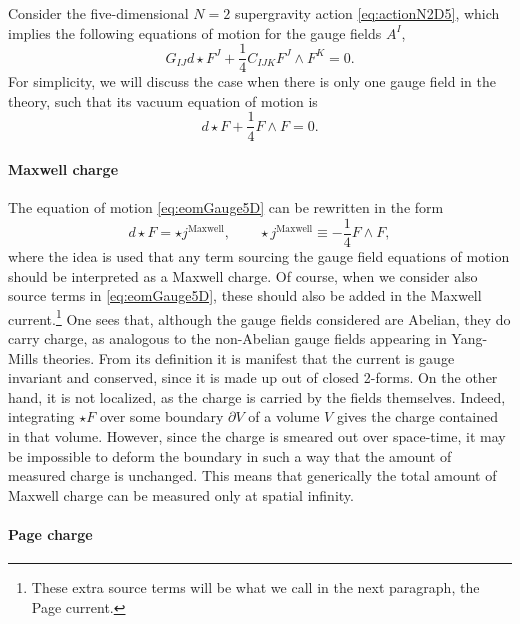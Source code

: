 \documentclass[12pt,twoside]{book}
\begin{document}
Consider the five-dimensional $N=2$ supergravity action \eqref{eq:actionN2D5}, which implies the following equations of motion for the gauge fields $A^{I}$,
\begin{equation}
G_{IJ}d\star F^{J} + \frac{1}{4} C_{IJK} F^{J} \wedge F^{K} = 0.
\end{equation}
For simplicity, we will discuss the case when there is only one gauge field in the theory, such that its vacuum equation of motion is
\begin{equation}\label{eq:eomGauge5D}
d\star F + \frac{1}{4}F \wedge F = 0.
\end{equation}

\paragraph{Maxwell charge}

The equation of motion \eqref{eq:eomGauge5D} can be rewritten in the form
\begin{equation}
d\star F = \star j^{\mathrm{Maxwell}}, \qquad  \star j^{\mathrm{Maxwell}} \equiv -\frac{1}{4}F \wedge F,
\end{equation}
where the idea is used that any term sourcing the gauge field equations of motion should be interpreted as a Maxwell charge. Of course, when we consider also source terms in \eqref{eq:eomGauge5D}, these should also be added in the Maxwell current.\footnote{
These extra source terms will be what we call in the next paragraph, the Page current.}
One sees that, although the gauge fields considered are Abelian, they do carry charge, as analogous to the non-Abelian gauge fields appearing in Yang-Mills theories. From its definition it is manifest that the current is gauge invariant and conserved, since it is made up out of closed 2-forms. On the other hand, it is not localized, as the charge is carried by the fields themselves. Indeed, integrating $\star F$ over some boundary $\partial V$ of a volume $V$ gives the charge contained in that volume. However, since the charge is smeared out over space-time, it may be impossible to deform the boundary in such a way that the amount of measured charge is unchanged. This means that generically the total amount of Maxwell charge can be measured only at spatial infinity.

\paragraph{Page charge}
\end{document}
